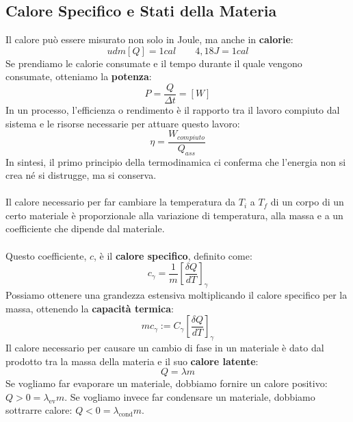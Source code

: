 \documentclass{article}
\begin{document}
\subsection{Calore Specifico e Stati della Materia}
Il calore può essere misurato non solo in Joule, ma anche in \textbf{calorie}:
\[
    udm[Q] = 1 cal \qquad 4,18 J = 1 cal
\]
Se prendiamo le calorie consumate e il tempo durante il quale vengono consumate, otteniamo la \textbf{potenza}:
\[
    P = \frac{Q}{\Delta t} = [W]
\]
In un processo, l'efficienza o rendimento è il rapporto tra il lavoro compiuto dal sistema e le risorse necessarie per attuare questo lavoro:
\[
    \eta = \frac{W_{compiuto}}{Q_{ass}}
\]
In sintesi, il primo principio della termodinamica ci conferma che l'energia non si crea né si distrugge, ma si conserva.\\
\\
Il calore necessario per far cambiare la temperatura da \(T_i\) a \(T_f\) di un corpo di un certo materiale è proporzionale alla variazione di temperatura, alla massa e a un coefficiente che dipende dal materiale.\\
\\
Questo coefficiente, \(c\), è il \textbf{calore specifico}, definito come:
\[
    c_{\gamma} = \frac{1}{m}[  \frac{\delta Q}{dT}  ]_{\gamma}
\]
Possiamo ottenere una grandezza estensiva moltiplicando il calore specifico per la massa, ottenendo la \textbf{capacità termica}:
\[
    mc_{\gamma} := C_{\gamma} [  \frac{\delta Q}{dT}  ]_{\gamma}
\]
Il calore necessario per causare un cambio di fase in un materiale è dato dal prodotto tra la massa della materia e il suo \textbf{calore latente}:
\[
    Q = \lambda m
\]
Se vogliamo far evaporare un materiale, dobbiamo fornire un calore positivo: \(Q > 0 = \lambda_{\text{ev}} m\). Se vogliamo invece far condensare un materiale, dobbiamo sottrarre calore: \(Q < 0 = \lambda_{\text{cond}} m\).
\newpage
\end{document}
